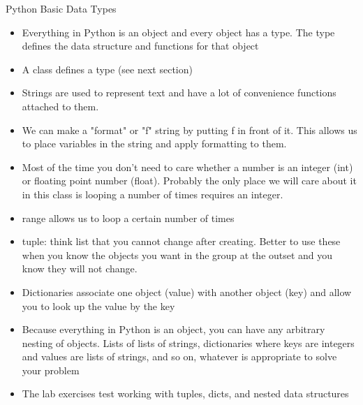 \documentclass[]{article}
\begin{document}
\begin{section}{Python Basic Data Types}
\begin{itemize}
\item Everything in Python is an object and every object has a type. The type defines the data structure and functions for that object
\item A class defines a type (see next section)
\item Strings are used to represent text and have a lot of convenience functions attached to them.
\item We can make a "format" or "f" string by putting f in front of it. This allows us to place variables in the string and apply formatting to them.
\item Most of the time you don't need to care whether a number is an integer (int) or floating point number (float). Probably the only place we will care about it in this class is looping a number of times requires an integer.
\item range allows us to loop a certain number of times
\item tuple: think list that you cannot change after creating. Better to use these when you know the objects you want in the group at the outset and you know they will not change.
\item Dictionaries associate one object (value) with another object (key) and allow you to look up the value by the key
\item Because everything in Python is an object, you can have any arbitrary nesting of objects. Lists of lists of strings, dictionaries where keys are integers and values are lists of strings, and so on, whatever is appropriate to solve your problem
\item The lab exercises test working with tuples, dicts, and nested data structures
\end{itemize}
\end{section}
\end{document}
